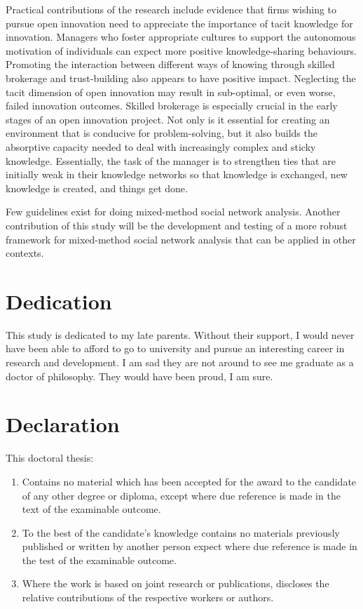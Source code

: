 \documentclass[12pt,table]{book}
\begin{document}
\noindent 
Practical contributions of the research include evidence that firms wishing to pursue open innovation need to appreciate the importance of tacit knowledge for innovation. Managers who foster appropriate cultures to support the autonomous motivation of individuals can expect more positive knowledge-sharing behaviours. Promoting the interaction between different ways of knowing through skilled brokerage and trust-building also appears to have positive impact. Neglecting the tacit dimension of open innovation may result in sub-optimal, or even worse, failed innovation outcomes. Skilled brokerage is especially crucial in the early stages of an open innovation project. Not only is it essential for creating an environment that is conducive for problem-solving, but it also builds the absorptive capacity needed to deal with increasingly complex and sticky knowledge. Essentially, the task of the manager is to strengthen ties that are initially weak in their knowledge networks so that knowledge is exchanged, new knowledge is created, and things get done. \medskip

\noindent
Few guidelines exist for doing mixed-method social network analysis. Another contribution of this study will be the development and testing of a more robust framework for mixed-method social network analysis that can be applied in other contexts.

\chapter*{Dedication}

This study is dedicated to my late parents. Without their support, I would never have been able to afford to go to university and pursue an interesting career in research and development. I am sad they are not around to see me graduate as a doctor of philosophy. They would have been proud, I am sure.

\chapter*{Declaration}

This doctoral thesis:

\begin{enumerate}
    \item Contains no material which has been accepted for the award to the candidate of any other degree or diploma, except where due reference is made in the text of the examinable outcome.
    \item To the best of the candidate’s knowledge contains no materials previously published or written by another person expect where due reference is made in the test of the examinable outcome.
    \item Where the work is based on joint research or publications, discloses the relative contributions of the respective workers or authors.
\end{enumerate} \bigskip
\end{document}

